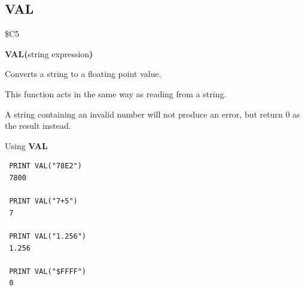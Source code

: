 
\newpage
\subsection{VAL}
\begin{description}[leftmargin=2cm,style=nextline]
\item [Token:] \$C5
\item [Format:] {\bf VAL(}string expression{\bf)}
\item [Usage:] Converts a string to a floating point value.

               This function acts in the same way as reading from a string.

\item [Remarks:] A string containing an invalid number
                 will not produce an error, but return 0 as the result instead.

\item [Example:] Using {\bf VAL}
\begin{tcolorbox}[colback=black,coltext=white]
\verbatimfont{\codefont}
\begin{verbatim}
 PRINT VAL("78E2")
 7800

 PRINT VAL("7+5")
 7

 PRINT VAL("1.256")
 1.256

 PRINT VAL("$FFFF")
 0
\end{verbatim}
\end{tcolorbox}
\end{description}


\newpage
